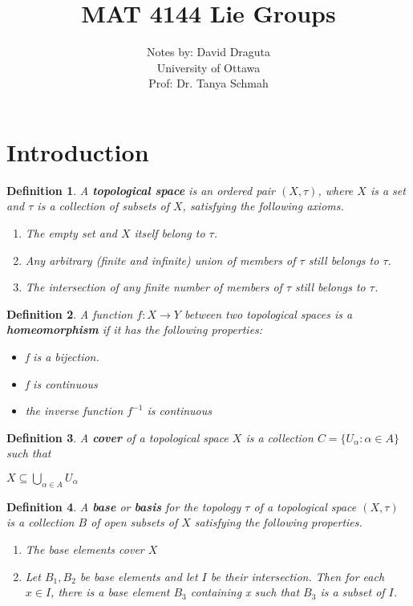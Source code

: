 \documentclass[12pt]{article}
\newcommand\inv[1]{#1^{-1}}
\newcommand\set[1]{\{#1\}}
\newtheorem{defn}{Definition}[thm]
\begin{document}
\date{}

 
\title{MAT 4144 Lie Groups}
\author{Notes by: David Draguta
  \\University of Ottawa\\ Prof: Dr. Tanya Schmah } 
 
\maketitle
\section{Introduction}

\begin{defn}
  A \textbf{topological space} is an ordered pair $(X, \tau)$, where $X$ is a set and $\tau$ is a collection of subsets of $X$, satisfying the following axioms.
  \begin{enumerate}
  \item The empty set and $X$ itself belong to $\tau$.
  \item Any arbitrary (finite and infinite) union of members of $\tau$ still belongs to $\tau$.
  \item The intersection of any finite number of members of $\tau$ still belongs to $\tau$.
  \end{enumerate}
\end{defn}

\begin{defn}
  A function $f: X \to Y$ between two topological spaces is a \textbf{homeomorphism} if it has the following properties:
  \begin{itemize}
  \item f is a bijection.
  \item f is continuous
  \item the inverse function $\inv{f}$ is continuous 
  \end{itemize}
\end{defn}

\begin{defn}
  A \textbf{cover} of a topological space $X$ is a collection $C = \set{U_{\alpha} : \alpha \in A}$ such that
  \begin{center}
    $X \subseteq \bigcup\limits_{\alpha \in A} U_{\alpha}$
  \end{center}
\end{defn}
\begin{defn}
  A \textbf{base} or \textbf{basis} for the topology $\tau$ of a topological space $(X,\tau)$ is a collection $B$ of open subsets of $X$ satisfying the following properties.
  \begin{enumerate}
  \item The base elements cover $X$
  \item Let $B_1, B_2$ be base elements and let $I$ be their intersection. Then for each $x \in I$, there is a base element $B_3$ containing x such that $B_3$ is a subset of $I$.
  \end{enumerate}
\end{defn}
\end{document}
